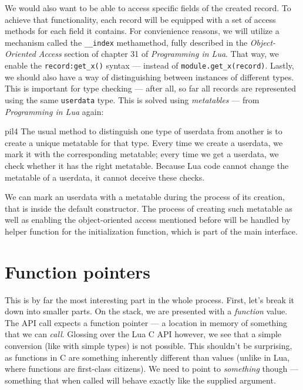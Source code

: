 \documentclass[polish, english]{iithesis}
\begin{document}
    We would also want to be able to access specific fields of the created record.
    To achieve that functionality, each record will be equipped with a set of access methods for each field it contains.
    For convienience reasons, we will utilize a mechanism called the \texttt{\_\_index} methamethod, fully described in the \textit{Object-Oriented Access} section of chapter 31 of \textit{Programming in Lua}.
    That way, we enable the \lstinline[language={[5.2]Lua}]|record:get_x()| syntax --- instead of \lstinline[language={[5.2]Lua}]|module.get_x(record)|.
    Lastly, we should also have a way of distinguishing between instances of different types.
    This is important for type checking --- after all, so far all records are represented using the same \texttt{userdata} type.
    This is solved using \textit{metatables} --- from \textit{Programming in Lua} again:
    \begin{displaycquote}{pil4}
      The usual method to distinguish one type of userdata from another is to create a unique metatable for that type.
      Every time we create a userdata, we mark it with the corresponding metatable; every time we get a userdata, we check whether it has the right metatable. 
      Because Lua code cannot change the metatable of a userdata, it cannot deceive these checks.
    \end{displaycquote}
    We can mark an userdata with a metatable during the process of its creation, that is inside the default constructor.
    The process of creating such metatable as well as enabling the object-oriented access mentioned before will be handled by helper function for the initialization function, which is part of the main interface.

  \section{Function pointers}
    This is by far the most interesting part in the whole process.
    First, let's break it down into smaller parts.
    On the stack, we are presented with a \textit{function} value.
    The API call expects a function pointer --- a location in memory of something that we can \textit{call}.
    Glossing over the Lua C API however, we see that a simple conversion (like with simple types) is not possible.
    This shouldn't be surprising, as functions in C are something inherently different than values (unlike in Lua, where functions are first-class citizens).
    We need to point to \textit{something} though --- something that when called will behave exactly like the supplied argument.
\end{document}
